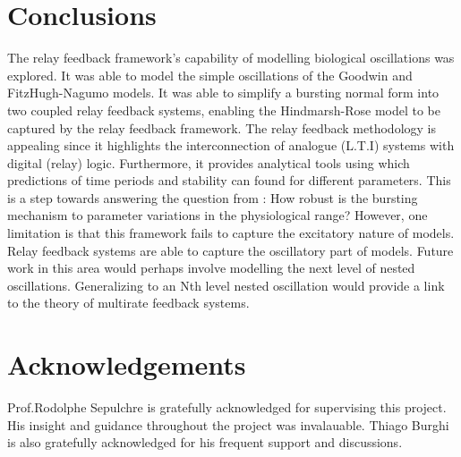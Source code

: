 \documentclass[a4paper, 12pt]{article}
\begin{document}
\section{Conclusions}
The relay feedback framework's capability of modelling biological oscillations was explored. It was able to model the simple oscillations of the Goodwin and FitzHugh-Nagumo models. It was able to simplify a bursting normal form into two coupled relay feedback systems, enabling the Hindmarsh-Rose model to be captured by the relay feedback framework. The relay feedback methodology is appealing since it highlights the interconnection of analogue (L.T.I) systems with digital (relay) logic. Furthermore, it provides analytical tools using which predictions of time periods and stability can found for different parameters. This is a step towards answering the question from \cite{rinzel}: How robust is the bursting mechanism to parameter variations in the physiological range?  However, one limitation is that this framework fails to capture the excitatory nature of models. Relay feedback systems are able to capture the oscillatory part of models. Future work in this area would perhaps involve modelling the next level of nested oscillations. Generalizing to an Nth level nested oscillation would provide a link to the theory of multirate feedback systems.


\section{Acknowledgements}
Prof.Rodolphe Sepulchre is gratefully acknowledged for supervising this project. His insight and guidance throughout the project was invalauable. Thiago Burghi is also gratefully acknowledged for his frequent support and discussions. 
\end{document}

